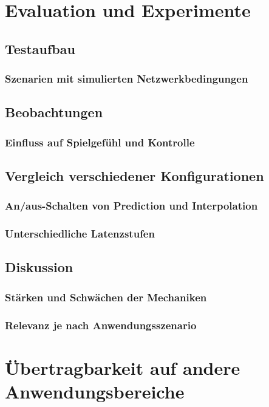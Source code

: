 \documentclass[12pt,a4paper]{article}
\begin{document}
\clearpage

\section{Evaluation und Experimente}
\subsection{Testaufbau}
\subsubsection{Szenarien mit simulierten Netzwerkbedingungen}
\subsection{Beobachtungen}
\subsubsection{Einfluss auf Spielgefühl und Kontrolle}
\subsection{Vergleich verschiedener Konfigurationen}
\subsubsection{An/aus-Schalten von Prediction und Interpolation}
\subsubsection{Unterschiedliche Latenzstufen}
\subsection{Diskussion}
\subsubsection{Stärken und Schwächen der Mechaniken}
\subsubsection{Relevanz je nach Anwendungsszenario}

\clearpage

\section{Übertragbarkeit auf andere Anwendungsbereiche}
\end{document}

